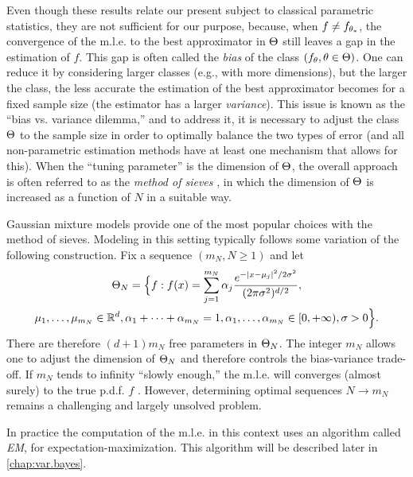 Even though these results relate our present subject
to classical parametric statistics, they are not sufficient for our purpose,
because, when $f\neq f_{\theta_*}$, the convergence of the m.l.e. to the best
approximator in $\Theta$ still leaves a gap in the estimation of $f$. This
gap is often called the {\em bias} of the class $(f_\theta, \theta\in \Theta)$. One can reduce it
 by considering larger classes (e.g., with more dimensions), but the larger the class, the less accurate the estimation of the best approximator becomes for a fixed sample size (the estimator has a larger
{\em variance}). This issue is known as the ``bias vs.\! variance dilemma,'' and to address it, it is necessary  to adjust the
class $\Theta$ to the sample size in order to optimally balance the two types of error (and all non-parametric estimation methods have at least one mechanism that allows for this). When the ``tuning parameter''  is the dimension of $\Theta$, the overall approach is often referred to as the  {\em method of sieves} \cite{grenander1981abstract,geman1982nonparametric}, in which  the dimension of $\Theta$ is increased as a function of $N$ in a suitable way.

Gaussian mixture models provide one of the most popular choices with the me\-thod of sieves. Modeling in this setting typically follows some variation of the following construction.
Fix a sequence $(m_N, N\geq 1)$ and let
\begin{multline}
\label{eq:MoG.model}
\Theta_N =  \Big\{f: f(x) =  \sum_{j=1}^{m_N} \alpha_j
\frac{e^{-|x-\mu_j|^2/2\sigma^2}}{(2\pi\sigma^2)^{d/2}},\\
 \mu_1, \ldots,
\mu_{m_N}\in{\mathbb{R}}^d, 
\alpha_1 + \cdots + \alpha_{m_N} = 1, \alpha_1, \ldots, \alpha_{m_N} \in [0, +\infty), \sigma>0\Big\}.
\end{multline}
There are therefore $(d+1) m_N$ free parameters in $\Theta_N$. The integer $m_N$ allows one to adjust the dimension of $\Theta_N$ and therefore controls the bias-variance trade-off. If  $m_N$ tends to infinity ``slowly enough,'' the m.l.e. will converges (almost surely) to the true p.d.f. $f$ \citep{geman1982nonparametric}.  However, determining optimal sequences $N \to m_N$ remains a challenging and largely unsolved  problem.

In practice the computation of  the
m.l.e. in this context uses an algorithm called {\em EM}, for expectation-maximization. This algorithm will be described later in \cref{chap:var.bayes}.

